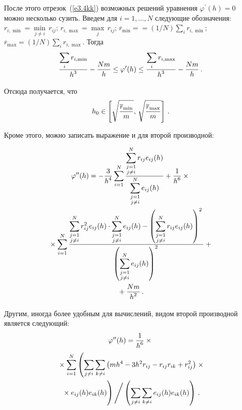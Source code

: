 \begin{multicols}{2}
      После этого отрезок~(\ref{e3.4kk}) возможных решений уравнения $\varphi^\prime(h)=0$ 
можно несколько сузить. Введем для $i=1, \ldots , N$ следующие обозначения: $r_{i,\min} 
=\min\limits_{j\not=i} \,r_{ij}$; $r_{i,\max} =\max\limits_j\,r_{ij}$; 
$\overline{r}_{\min}=$\linebreak $=(1/N)\sum\limits_i r_{i,\min}$; $\overline{r}_{\max} =(1/N)\sum\limits_i 
r_{i,\max}$. Тогда
      $$
      \displaystyle\frac{\displaystyle \sum\limits_i r_{i,\min}\mathstrut}{\displaystyle h^3\mathstrut} -\displaystyle\frac{\displaystyle Nm\mathstrut}{\displaystyle h\mathstrut}\leq \varphi^\prime(h) \leq \displaystyle\frac{\displaystyle \sum\limits_i 
r_{i,\max}\mathstrut}{\displaystyle h^3\mathstrut}-\displaystyle\frac{\displaystyle Nm\mathstrut}{\displaystyle h\mathstrut}\,.
      $$

Отсюда получается, что
$$
h_0\in \left[\sqrt{\displaystyle\frac{\displaystyle \overline{r}_{\min}\mathstrut}{\displaystyle m\mathstrut}},\,\sqrt{\displaystyle\frac{\displaystyle \overline{r}_{\max}\mathstrut}{\displaystyle m\mathstrut}}\right ]\,.
$$
      
Кроме этого, можно записать выражение и для второй производной:

\noindent
      \begin{multline*}
      \varphi^{\prime\prime}(h) =-\displaystyle\frac{\displaystyle 3\mathstrut}{\displaystyle h^4\mathstrut}\sum\limits_{i=1}^N 
\displaystyle\frac{\displaystyle \sum\limits_{\substack{{j=1}\\ {j\not=i}}}^N  r_{ij} e_{ij}(h)\mathstrut}{\displaystyle \sum\limits_{\substack{{j=1}\\ 
{j\not=i}}}^N  e_{ij}(h)\mathstrut}+\displaystyle\frac{\displaystyle 1\mathstrut}{\displaystyle h^6\mathstrut}\times{}\\
      {}\times \sum\limits_{i=1}^N
      \displaystyle\frac{\displaystyle \sum\limits_{\substack{{j=1}\\ {j\not=i}}}^N r_{ij}^2 
e_{ij}(h)\cdot \sum\limits_{\substack{{j=1}\\ {j\not=i}}}^N  e_{ij}(h)-
\left(\sum\limits_{\substack{{j=1}\\ {j\not=i}}}^N  
r_{ij}e_{ij}(h)\right)^2\mathstrut}{\displaystyle \left(\sum\limits_{\substack{{j=1}\\ {j\not=i}}}^N  
e_{ij}(h)\right)^2\mathstrut}+{}\\
{}+\displaystyle\frac{\displaystyle Nm\mathstrut}{\displaystyle h^2\mathstrut}\,.
      \end{multline*}
      
      Другим, иногда более удобным для вычислений, видом второй производной является 
следующий:
      \begin{multline*}
      \varphi^{\prime\prime}(h) =\fr{1}{h^6}\times{}\\
{}     \times
      \sum\limits_{i=1}^N
      \left( \sum\limits_{j\not=i}\sum\limits_{k\not=i} \left( mh^4-3h^2r_{ij}-r_{ij}r_{ik}+r_{ij}^2\right)\right.\times\\ 
\left.{}\times e_{ij}(h) e_{ik}(h)
\vphantom{\sum\limits_{j\not=i}\sum\limits_{k\not=i}}\right)
\Bigg /\left( \sum\limits_{j\not= i}\sum\limits_{k\not= i} e_{ij}(h) e_{ik}(h)\right )\,.
      \end{multline*}
      

\end{multicols}
